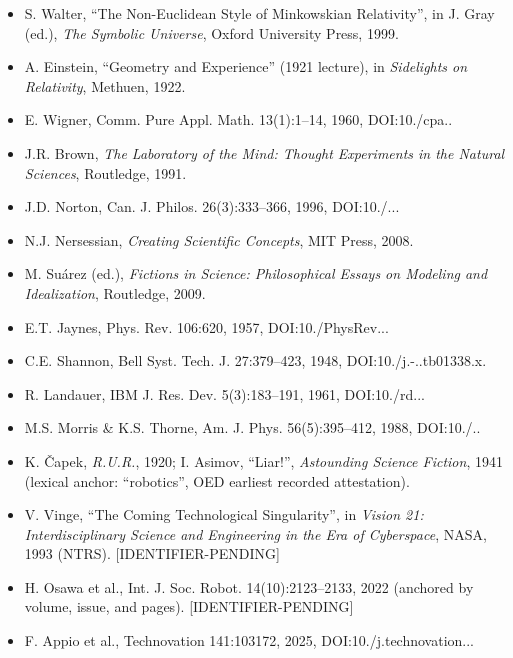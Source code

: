 \documentclass[11pt,a4paper]{article}
\begin{document}
\begin{itemize}[leftmargin=1.6em,itemsep=2pt,parsep=0pt,topsep=3pt]
\item[R01.] S. Walter, ``The Non-Euclidean Style of Minkowskian Relativity'', in J. Gray (ed.), \textit{The Symbolic Universe}, Oxford University Press, 1999.
\item[R02.] A. Einstein, ``Geometry and Experience'' (1921 lecture), in \textit{Sidelights on Relativity}, Methuen, 1922.
\item[R03.] E. Wigner, Comm. Pure Appl. Math. 13(1):1–14, 1960, DOI:10./\allowbreak cpa..\allowbreak 
\item[R04.] J.R. Brown, \textit{The Laboratory of the Mind: Thought Experiments in the Natural Sciences}, Routledge, 1991.
\item[R05.] J.D. Norton, Can. J. Philos. 26(3):333–366, 1996, DOI:10./...\allowbreak 
\item[R06.] N.J. Nersessian, \textit{Creating Scientific Concepts}, MIT Press, 2008.
\item[R07.] M. Suárez (ed.), \textit{Fictions in Science: Philosophical Essays on Modeling and Idealization}, Routledge, 2009.
\item[R08.] E.T. Jaynes, Phys. Rev. 106:620, 1957, DOI:10./\allowbreak PhysRev...\allowbreak 
\item[R09.] C.E. Shannon, Bell Syst. Tech. J. 27:379–423, 1948, DOI:10./\allowbreak j.-..\allowbreak tb01338.\allowbreak x.\allowbreak 
\item[R10.] R. Landauer, IBM J. Res. Dev. 5(3):183–191, 1961, DOI:10./\allowbreak rd...\allowbreak 
\item[R11.] M.S. Morris \& K.S. Thorne, Am. J. Phys. 56(5):395–412, 1988, DOI:10./..\allowbreak 
\item[R12.] K. Čapek, \textit{R.U.R.}, 1920; I. Asimov, ``Liar!'', \textit{Astounding Science Fiction}, 1941 (lexical anchor: ``robotics'', OED earliest recorded attestation).
\item[R13.] V. Vinge, ``The Coming Technological Singularity'', in \textit{Vision 21: Interdisciplinary Science and Engineering in the Era of Cyberspace}, NASA, 1993 (NTRS). [IDENTIFIER-PENDING]
\item[R14.] H. Osawa et al., Int. J. Soc. Robot. 14(10):2123–2133, 2022 (anchored by volume, issue, and pages). [IDENTIFIER-PENDING]
\item[R15.] F. Appio et al., Technovation 141:103172, 2025, DOI:10./\allowbreak j.\allowbreak technovation...\allowbreak 
\end{itemize}
\end{document}
